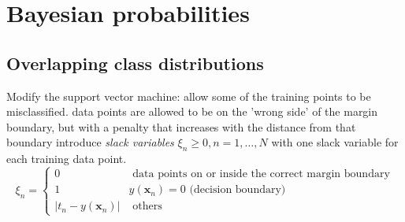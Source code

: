 \documentclass[a4paper]{article}
\begin{document}
\section{Bayesian probabilities}



\subsection{Overlapping class distributions}
Modify the support vector machine: allow some of the training points to be misclassiﬁed.
data points are allowed to be on the 'wrong side' of the margin
boundary, but with a penalty that increases with the distance from that boundary
introduce \textit{slack variables} $\xi_n \geq 0, n=1,\dots,N$ with
one slack variable for each training data point.
\[
\xi_n =
\begin{cases}
 0 & \text{ data points on or inside the correct margin boundary}\\
 1 & y(\mathbf{x}_n) = 0 \text{ (decision boundary)}\\
 |t_n-y(\mathbf{x}_n)| & \text{ others}
\end{cases}
\]
\end{document}
